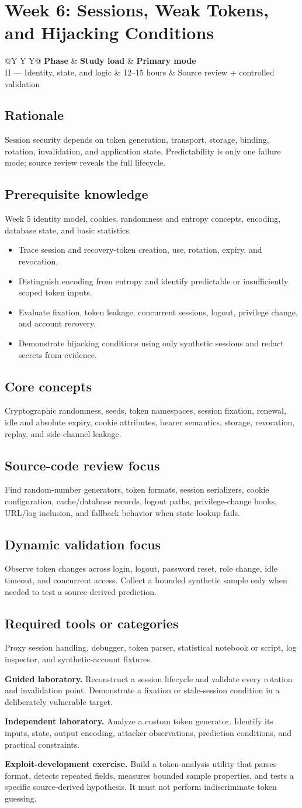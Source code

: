 \documentclass[11pt]{article}
\makeatletter
\newcommand{\weekheader}[4]{%
  \clearpage
  \section{Week #1: #2}
  \begin{tcolorbox}[colback=Navy,colframe=Navy,coltext=white]
    \begin{tabularx}{\linewidth}{@{}Y Y Y@{}}
      \textbf{Phase} & \textbf{Study load} & \textbf{Primary mode}\\
      #3 & #4 hours & Source review + controlled validation
    \end{tabularx}
  \end{tcolorbox}
}
\newcommand{\weekfield}[2]{%
  \Needspace{5\baselineskip}
  \subsection*{#1}
  #2
}
\makeatother
\begin{document}
\weekheader{6}{Sessions, Weak Tokens, and Hijacking Conditions}{II --- Identity, state, and logic}{12--15}

\weekfield{Rationale}{Session security depends on token generation, transport,
storage, binding, rotation, invalidation, and application state. Predictability is
only one failure mode; source review reveals the full lifecycle.}

\weekfield{Prerequisite knowledge}{Week 5 identity model, cookies, randomness and
entropy concepts, encoding, database state, and basic statistics.}

\begin{objectivebox}
\begin{itemize}
  \item Trace session and recovery-token creation, use, rotation, expiry, and revocation.
  \item Distinguish encoding from entropy and identify predictable or insufficiently scoped token inputs.
  \item Evaluate fixation, token leakage, concurrent sessions, logout, privilege change, and account recovery.
  \item Demonstrate hijacking conditions using only synthetic sessions and redact secrets from evidence.
\end{itemize}
\end{objectivebox}

\weekfield{Core concepts}{Cryptographic randomness, seeds, token namespaces,
session fixation, renewal, idle and absolute expiry, cookie attributes, bearer
semantics, storage, revocation, replay, and side-channel leakage.}

\weekfield{Source-code review focus}{Find random-number generators, token formats,
session serializers, cookie configuration, cache/database records, logout paths,
privilege-change hooks, URL/log inclusion, and fallback behavior when state lookup
fails.}

\weekfield{Dynamic validation focus}{Observe token changes across login, logout,
password reset, role change, idle timeout, and concurrent access. Collect a
bounded synthetic sample only when needed to test a source-derived prediction.}

\weekfield{Required tools or categories}{Proxy session handling, debugger,
token parser, statistical notebook or script, log inspector, and synthetic-account
fixtures.}

\begin{labbox}
\textbf{Guided laboratory.} Reconstruct a session lifecycle and validate every
rotation and invalidation point. Demonstrate a fixation or stale-session condition
in a deliberately vulnerable target.

\textbf{Independent laboratory.} Analyze a custom token generator. Identify its
inputs, state, output encoding, attacker observations, prediction conditions, and
practical constraints.

\textbf{Exploit-development exercise.} Build a token-analysis utility that parses
format, detects repeated fields, measures bounded sample properties, and tests a
specific source-derived hypothesis. It must not perform indiscriminate token
guessing.
\end{labbox}
\end{document}
